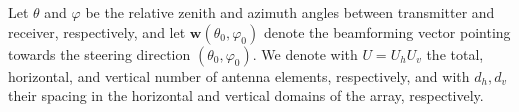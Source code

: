 Let $\theta$ and $\varphi$ be the relative zenith and azimuth angles between transmitter and receiver, respectively, and let $\bm{w}\left(\theta_0, \varphi_0\right)$ denote the beamforming vector pointing towards the steering direction $\left(\theta_0, \varphi_0\right)$. We denote with $U = U_h U_v $ the total, horizontal, and vertical number of antenna elements, respectively, and with $ d_h, d_v $ their spacing in the horizontal and vertical domains of the array, respectively. %
\begin{comment}
The gain pattern of the antenna array, in terms of received power relative to a single radiating element, can be expressed as~\cite{ASPLUND202089}
\begin{equation}
  G_{T, R}(\theta, \varphi) = \left|\bm{a}^{\mathrm{T}}(\theta, \varphi)  \bm{w}\left(\theta_0, \varphi_0\right)\right|^2,
\end{equation}
where $\bm{a}^{\mathrm{T}}(\theta, \varphi)$ is the array response vector. A generic entry $m,n, m \in \{0, \ldots, U_v - 1 \}, n \in \{0, \ldots, U_h - 1 \}$ of this vector is defined as
\begin{align}
  a(\theta, \varphi)_{m, n} = g(\theta, \varphi)_{m, n} & \exp(j\frac{2\pi}{\lambda}m d_v \cos(\theta)) \times \\
    & \exp(j \frac{2\pi}{\lambda} n d_h \sin(\theta)\sin(\varphi)), \nonumber
\end{align}
where $g(\theta, \varphi)_{m, n}$ is the single-element gain of radiating element $(m, n)$ towards direction $(\theta, \varphi)$.
%
In our implementation, we assume that $g(\theta, \varphi)_{m, n}$ is constant for all the elements of the arrays, i.e., $g(\theta, \varphi)_{m, n} \equiv g(\theta, \varphi)$. Accordingly, we define
\begin{equation}
    \bm{a_i(\theta, \varphi)} \doteq \left[ a_i(\theta, \varphi)_{m, n} \right]_{m, n} = \left[ g(\theta, \varphi)_{m, n}^{-1} a(\theta, \varphi)_{m, n} \right]_{m, n}
\end{equation}
and then compute $G_{T, R}(\theta, \varphi)$ in the \texttt{Compute\-Beamforming\-Gain} function of the \texttt{Two\-Ray\-Spectrum\-Propagation\-Loss\-Model} class as
\begin{equation}
  G_{T, R}(\theta, \varphi) = \left| g(\theta, \varphi) \left[ \bm{a_i}^{\mathrm{T}}(\theta, \varphi)  \bm{w}\left(\theta_0, \varphi_0\right) \right] \right|^2.
\end{equation}
\end{comment}


